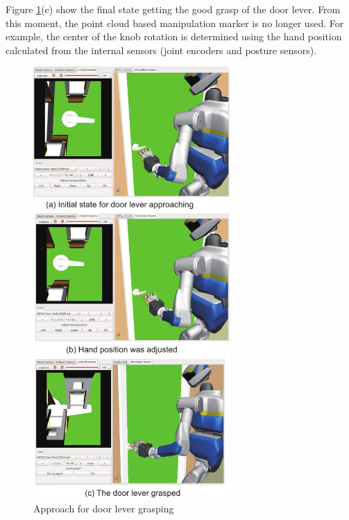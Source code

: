 Figure \ref{fig:door_lever_grasp}(c) show the final state getting the good grasp of the door lever. From this moment, the point cloud based manipulation marker is no longer used. For example, the center of the knob rotation is determined using the hand position calculated from the internal sensors (joint encoders and posture sensors). 
%
\begin{figure}[t]
  \centering
  \includegraphics[width = 7.5cm]{img/approach_door_lever}
  \caption{Approach for door lever grasping}
  \label{fig:door_lever_grasp}
\end{figure}


